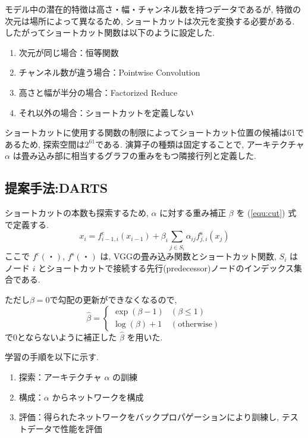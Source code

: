 モデル中の潜在的特徴は高さ・幅・チャンネル数を持つデータであるが,
特徴の次元は場所によって異なるため, ショートカットは次元を変換する必要がある.
したがってショートカット関数は以下のように設定した.
\begin{enumerate}
  \item 次元が同じ場合：恒等関数
  \item チャンネル数が違う場合：Pointwise Convolution
  \item 高さと幅が半分の場合：Factorized Reduce
  \item それ以外の場合：ショートカットを定義しない
\end{enumerate}
ショートカットに使用する関数の制限によってショートカット位置の候補は61であるため,
探索空間は$2^{61}$である.
演算子の種類は固定することで, アーキテクチャ $\alpha$ は畳み込み部に相当するグラフの重みをもつ隣接行列と定義した.


\changeindent{0cm}
\subsection{提案手法:DARTS}
\label{sec:pred.01}
\changeindent{2cm}

ショートカットの本数も探索するため,
$\alpha$ に対する重み補正 $\beta$ を (\ref{equ:cut}) 式 で定義する.
\begin{equation}
  \label{equ:cut}
  x_i = f^{\mathrm{c}}_{i-1, i}(x_{i-1}) + \beta_i \sum_{j \in S_i} \alpha_{ij} f^{\mathrm{s}}_{j, i} (x_j)
\end{equation}
ここで $f^{\mathrm{c}}(・)$, $f^{\mathrm{s}}(・)$ は, VGGの畳み込み関数とショートカット関数,
$S_i$ はノード $i$ とショートカットで接続する先行(predecessor)ノードのインデックス集合である.

ただし$\beta=0$で勾配の更新ができなくなるので,
\begin{equation}
  \label{equ:beta}
  \hat{\beta} = \begin{cases}
    \exp(\beta - 1) & (\beta \leq 1) \\
    \log(\beta) + 1 & (\mathrm{otherwise})
  \end{cases}
\end{equation}
で0とならないように補正した $\hat{\beta}$ を用いた.

学習の手順を以下に示す.
\begin{enumerate}
  \item 探索：アーキテクチャ $\alpha$ の訓練
  \item 構成：$\alpha$ からネットワークを構成
  \item 評価：得られたネットワークをバックプロパゲーションにより訓練し, テストデータで性能を評価
\end{enumerate}

